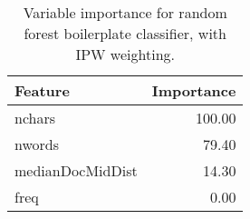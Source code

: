 \begin{table}[ht]
\centering
\begin{tabular}{lr}
  \hline
Feature & Importance \\ 
  \hline
nchars & 100.00 \\ 
  nwords & 79.40 \\ 
  medianDocMidDist & 14.30 \\ 
  freq & 0.00 \\ 
   \hline
\end{tabular}
\caption{Variable importance for random forest boilerplate classifier, with IPW weighting.} 
\end{table}

